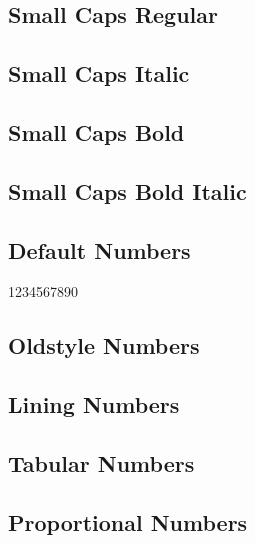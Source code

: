 \documentclass{article}
\begin{document}
\textbf{\textit{\lipsum[4]}}

\subsection*{Small Caps Regular}
\textsc{\lipsum[5]}

\subsection*{Small Caps Italic}
\textsc{\textit{\lipsum[6]}}

\subsection*{Small Caps Bold}
\textsc{\textbf{\lipsum[7]}}

\subsection*{Small Caps Bold Italic}

\textsc{\textbf{\textit{\lipsum[8]}}}

\subsection*{Default Numbers}

1234567890

\subsection*{Oldstyle Numbers}


\subsection*{Lining Numbers}


\subsection*{Tabular Numbers}


\subsection*{Proportional Numbers}

\end{document}
